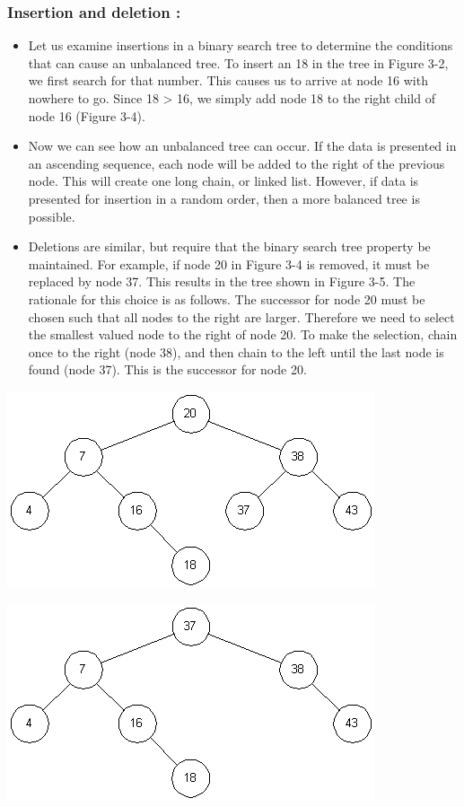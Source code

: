 \documentclass[10pt,a4paper]{article}
\begin{document}
\begin{itemize}
    	\subsubsection{Insertion and deletion : }
        \begin{itemize}
			\item Let us examine insertions in a binary search tree to determine the conditions that can cause an unbalanced tree. To insert an 18 in the tree in Figure 3-2, we first search for that number. This causes us to arrive at node 16 with nowhere to go. Since 18 > 16, we simply add node 18 to the right child of node 16 (Figure 3-4). 
            \item Now we can see how an unbalanced tree can occur. If the data is presented in an ascending sequence, each node will be added to the right of the previous node. This will create one long chain, or linked list. However, if data is presented for insertion in a random order, then a more balanced tree is possible. 
            \item Deletions are similar, but require that the binary search tree property be maintained. For example, if node 20 in Figure 3-4 is removed, it must be replaced by node 37. This results in the tree shown in Figure 3-5. The rationale for this choice is as follows. The successor for node 20 must be chosen such that all nodes to the right are larger. Therefore we need to select the smallest valued node to the right of node 20. To make the selection, chain once to the right (node 38), and then chain to the left until the last node is found (node 37). This is the successor for node 20. 
		\end{itemize}
	\end{itemize}
			\includegraphics[scale = 0.8]{A1_03}
		
			\includegraphics[scale = 0.8]{A1_04}
		
\end{document}
